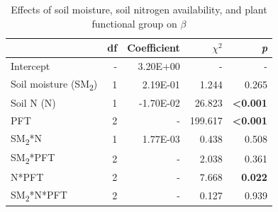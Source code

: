 \newpage
\begin{table}
    \centering
    \caption{Effects of soil moisture, soil nitrogen availability, and plant functional group on $\beta$}
        \begin{tabular}{p{3.75cm}p{0.5cm}p{2cm}p{1.5cm}p{1.5cm}}
            \hline 
            & \multicolumn{1}{r}{df} 
            & \multicolumn{1}{r}{Coefficient} 
            & \multicolumn{1}{r}{$\chi^{2}$} 
            & \multicolumn{1}{r}{\textit{p}} 
            \\ 
            \hline
            
            Intercept
            & \multicolumn{1}{r}{-}
            & \multicolumn{1}{r}{3.20E+00}
            & \multicolumn{1}{r}{-}
            & \multicolumn{1}{r}{-}
            \\

            Soil moisture (SM\textsubscript{2})
            & \multicolumn{1}{r}{1}
            & \multicolumn{1}{r}{2.19E-01}
            & \multicolumn{1}{r}{1.244}
            & \multicolumn{1}{r}{0.265}
            \\

            Soil N (N)
            & \multicolumn{1}{r}{1}
            & \multicolumn{1}{r}{-1.70E-02}
            & \multicolumn{1}{r}{26.823}
            & \multicolumn{1}{r}{\textbf{<0.001}}
            \\

            PFT
            & \multicolumn{1}{r}{2}
            & \multicolumn{1}{r}{-}
            & \multicolumn{1}{r}{199.617}
            & \multicolumn{1}{r}{\textbf{<0.001}}
            \\

            SM\textsubscript{2}*N
            & \multicolumn{1}{r}{1}
            & \multicolumn{1}{r}{1.77E-03}
            & \multicolumn{1}{r}{0.438}
            & \multicolumn{1}{r}{0.508}
            \\

            SM\textsubscript{2}*PFT
            & \multicolumn{1}{r}{2}
            & \multicolumn{1}{r}{-}
            & \multicolumn{1}{r}{2.038}
            & \multicolumn{1}{r}{0.361}
            \\

            N*PFT
            & \multicolumn{1}{r}{2}
            & \multicolumn{1}{r}{-}
            & \multicolumn{1}{r}{7.668}
            & \multicolumn{1}{r}{\textbf{0.022}}
            \\

            SM\textsubscript{2}*N*PFT
            & \multicolumn{1}{r}{2}
            & \multicolumn{1}{r}{-}
            & \multicolumn{1}{r}{0.127}
            & \multicolumn{1}{r}{0.939}
            \\
            \hline
        \end{tabular}%
    \label{tab:table4.2}
\end{table}
